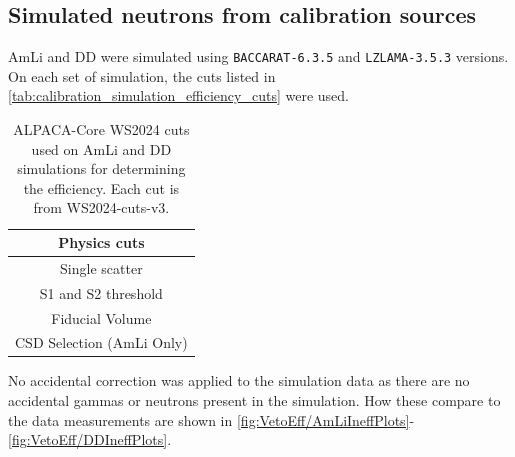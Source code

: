 \subsection{Simulated neutrons from calibration sources}
AmLi and DD were simulated using \lstinline{BACCARAT-6.3.5} and \lstinline{LZLAMA-3.5.3} versions.
On each set of simulation, the cuts listed in \autoref{tab:calibration_simulation_efficiency_cuts} were used.
\begin{table}
	\centering
	\begin{tabular}{|c|}
    \hline
		Physics cuts              \\
		\hline
		Single scatter            \\
		S1 and S2 threshold       \\
		Fiducial Volume           \\
		CSD Selection (AmLi Only) \\
        \hline
	\end{tabular}
	\caption{ALPACA-Core WS2024 cuts used on AmLi and DD simulations for determining the efficiency. Each cut is from WS2024-cuts-v3.}
	\label{tab:calibration_simulation_efficiency_cuts}
\end{table}
No accidental correction was applied to the simulation data as there are no accidental gammas or neutrons present in the simulation.
How these compare to the data measurements are shown in \autoref{fig:VetoEff/AmLiIneffPlots}-\ref{fig:VetoEff/DDIneffPlots}.
